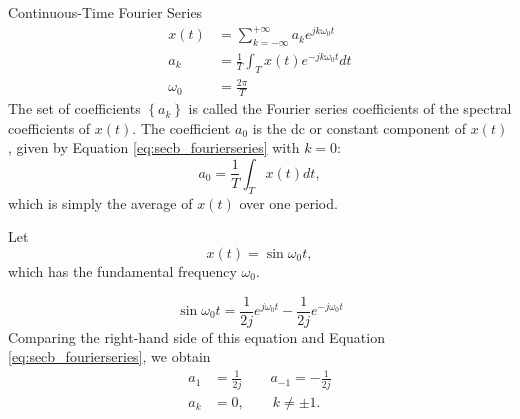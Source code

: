 \begin{frame}{Continuous-Time Fourier Series}
    {
        \begin{equation}\label{eq:secb_fourierseries}
            \begin{aligned}
                x(t) &= \sum_{k=-\infty}^{+\infty}a_k e^{jk\omega_0 t}\\
                a_k &= \frac{1}{T} \int_{T}x(t)e^{-jk\omega_0 t}dt\\
                \omega_0 &= \frac{2\pi}{T}
            \end{aligned}
        \end{equation}
        The set of coefficients $\left\{a_k\right\}$ is called the \alert{Fourier series coefficients} of the \alert{spectral coefficients} of $x(t)$.
        The coefficient $a_0$ is the dc or constant component of $x(t)$, given by Equation \ref{eq:secb_fourierseries} with $k=0$:
        \begin{equation}\label{eq:secb_a0}
            a_0 = \frac{1}{T} \int_{T}x(t)dt,
        \end{equation}
        which is simply the average of $x(t)$ over one period.
    }
\end{frame}

\begin{frame}[plain]
    \begin{example}
        Let
        \begin{equation*}
            x(t) = \sin \omega_0t,
        \end{equation*}
        which has the fundamental frequency $\omega_0$.
    \end{example}
    
    {
        \begin{equation*}
            \sin \omega_0t = \frac{1}{2j}e^{j\omega_0 t}- \frac{1}{2j}e^{-j\omega_0 t}
        \end{equation*}
        Comparing the right-hand side of this equation and Equation \ref{eq:secb_fourierseries}, we obtain
        \begin{equation*}
            \begin{split}
            a_1 &=  \frac{1}{2j} \qquad a_{-1} = -\frac{1}{2j}\\
            a_k &=0, \qquad k \neq \pm 1.\\            
            \end{split}
        \end{equation*}
    }
\end{frame}

